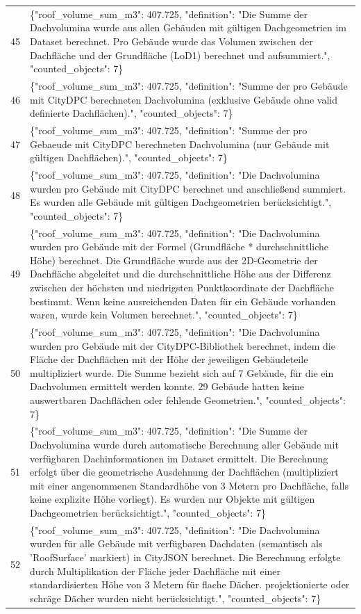 \documentclass[a4paper,11pt]{article}
\begin{document}
\begin{table}[ht]
\begin{tabular}{r p{12cm}}
45 & \{"roof\_volume\_sum\_m3": 407.725, "definition": "Die Summe der Dachvolumina wurde aus allen Gebäuden mit gültigen Dachgeometrien im Dataset berechnet. Pro Gebäude wurde das Volumen zwischen der Dachfläche und der Grundfläche (LoD1) berechnet und aufsummiert.", "counted\_objects": 7\} \\
46 & \{"roof\_volume\_sum\_m3": 407.725, "definition": "Summe der pro Gebäude mit CityDPC berechneten Dachvolumina (exklusive Gebäude ohne valid definierte Dachflächen).", "counted\_objects": 7\} \\
47 & \{"roof\_volume\_sum\_m3": 407.725, "definition": "Summe der pro Gebaeude mit CityDPC berechneten Dachvolumina (nur Gebäude mit gültigen Dachflächen).", "counted\_objects": 7\} \\
48 & \{"roof\_volume\_sum\_m3": 407.725, "definition": "Die Dachvolumina wurden pro Gebäude mit CityDPC berechnet und anschließend summiert. Es wurden alle Gebäude mit gültigen Dachgeometrien berücksichtigt.", "counted\_objects": 7\} \\
49 & \{"roof\_volume\_sum\_m3": 407.725, "definition": "Die Dachvolumina wurden pro Gebäude mit der Formel (Grundfläche * durchschnittliche Höhe) berechnet. Die Grundfläche wurde aus der 2D-Geometrie der Dachfläche abgeleitet und die durchschnittliche Höhe aus der Differenz zwischen der höchsten und niedrigsten Punktkoordinate der Dachfläche bestimmt. Wenn keine ausreichenden Daten für ein Gebäude vorhanden waren, wurde kein Volumen berechnet.", "counted\_objects": 7\} \\
50 & \{"roof\_volume\_sum\_m3": 407.725, "definition": "Die Dachvolumina wurden pro Gebäude mit der CityDPC-Bibliothek berechnet, indem die Fläche der Dachflächen mit der Höhe der jeweiligen Gebäudeteile multipliziert wurde. Die Summe bezieht sich auf 7 Gebäude, für die ein Dachvolumen ermittelt werden konnte. 29 Gebäude hatten keine auswertbaren Dachflächen oder fehlende Geometrien.", "counted\_objects": 7\} \\
51 & \{"roof\_volume\_sum\_m3": 407.725, "definition": "Die Summe der Dachvolumina wurde durch automatische Berechnung aller Gebäude mit verfügbaren Dachinformationen im Dataset ermittelt. Die Berechnung erfolgt über die geometrische Ausdehnung der Dachflächen (multipliziert mit einer angenommenen Standardhöhe von 3 Metern pro Dachfläche, falls keine explizite Höhe vorliegt). Es wurden nur Objekte mit gültigen Dachgeometrien berücksichtigt.", "counted\_objects": 7\} \\
52 & \{"roof\_volume\_sum\_m3": 407.725, "definition": "Die Dachvolumina wurden für alle Gebäude mit verfügbaren Dachdaten (semantisch als 'RoofSurface' markiert) in CityJSON berechnet. Die Berechnung erfolgte durch Multiplikation der Fläche jeder Dachfläche mit einer standardisierten Höhe von 3 Metern für flache Dächer. projektionierte oder schräge Dächer wurden nicht berücksichtigt.", "counted\_objects": 7\} \\

\end{tabular}
\end{table}
\end{document}
